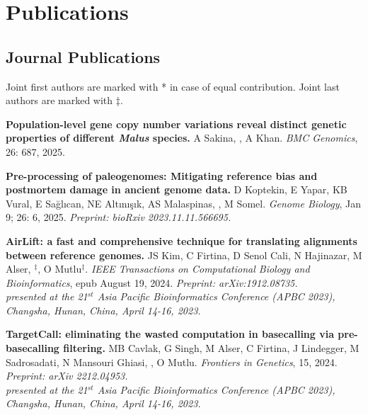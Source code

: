 \section{\sc Publications}
                                       
                                       \vspace{-0.5cm}
                                       
                                       \subsection{\small \sc Journal Publications}
                                       \vspace{-0.6cm}
                                       
                                       \small{
                                         Joint first authors are marked with * in case of equal contribution. Joint last authors are marked with $\ddag$.
                                       }


\vspace{-.2cm}
    {\bf Population-level gene copy number variations reveal distinct genetic properties of different \textit{Malus} species.}  A Sakina, \calkan{}, A Khan.  {\it BMC Genomics},  26: 687, 2025. 

\vspace{-.2cm}
    {\bf Pre-processing of paleogenomes: Mitigating reference bias and postmortem damage in ancient genome data.}  D Koptekin,  E Yapar,  KB Vural,  E Sağlıcan,  NE Altınışık,  AS Malaspinas,  \calkan,  M Somel. {\it Genome Biology},  Jan 9; 26: 6, 2025. \textit{Preprint: bioRxiv 2023.11.11.566695.}

\vspace{-.2cm}
    {\bf AirLift: a fast and comprehensive technique for translating alignments between reference genomes.} JS Kim, C Firtina, D Senol Cali,  N Hajinazar, M Alser, \calkan{}$^\ddag$, O Mutlu$^\ddag$.  {\it IEEE Transactions on Computational Biology and Bioinformatics}, epub August 19, 2024. \textit{Preprint: arXiv:1912.08735.}\\
    \hspace*{1cm}
    {\footnotesize \em presented at the 21$^{st}$ Asia Pacific Bioinformatics Conference (APBC 2023), Changsha, Hunan, China, April 14-16, 2023.}

\vspace{-.2cm}
    {\bf TargetCall: eliminating the wasted computation in basecalling via pre-basecalling filtering.}  
    MB Cavlak, G Singh, M Alser, C Firtina, J Lindegger, M Sadrosadati, N Mansouri Ghiasi, \calkan{}, O Mutlu. {\it Frontiers in Genetics}, 15, 2024. \textit{Preprint: arXiv 2212.04953.}\\
    \hspace*{1cm}
    {\footnotesize \em presented at the 21$^{st}$ Asia Pacific Bioinformatics Conference (APBC 2023), Changsha, Hunan, China, April 14-16, 2023.}


